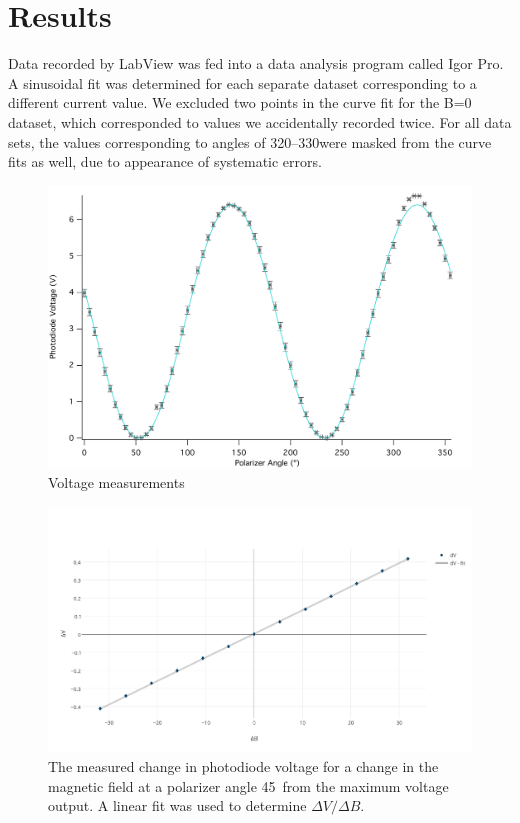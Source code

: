 \documentclass[prb,preprint]{revtex4-1}
\begin{document}
\section{Results}
{Data recorded by LabView was fed into a data analysis program called Igor Pro.  A sinusoidal fit was determined for each separate dataset corresponding to a different current value.  We excluded two points in the curve fit for the B=0 dataset, which corresponded to values we accidentally recorded twice. For all data sets, the values corresponding to angles of 320\degree--330\degree were masked from the curve fits as well, due to appearance of systematic errors. 
\begin{figure}
\includegraphics[width = 6.3in]{0A.pdf}
\caption{\label{nofield}Voltage measurements }

\end{figure}

\begin{figure}[b]
\includegraphics[width =6.3in]{verdetpic2.pdf}
\caption{\label{method2pic} The measured change in photodiode voltage for a change in the magnetic field at a polarizer angle 45\degree\  from the maximum voltage output. A linear fit was used to determine $\Delta V/\Delta B$.}
\end{figure}
}
\end{document}
